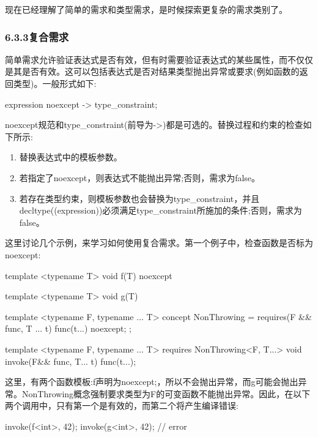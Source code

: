 现在已经理解了简单的需求和类型需求，是时候探索更复杂的需求类别了。

\subsubsection{6.3.3\hspace{0.2cm}复合需求}

简单需求允许验证表达式是否有效，但有时需要验证表达式的某些属性，而不仅仅是其是否有效。这可以包括表达式是否对结果类型抛出异常或要求(例如函数的返回类型)。一般形式如下:

\begin{cpp}
{ expression } noexcept -> type_constraint;
\end{cpp}

noexcept规范和type\_constraint(前导为->)都是可选的。替换过程和约束的检查如下所示:

\begin{enumerate}
\item
替换表达式中的模板参数。

\item
若指定了noexcept，则表达式不能抛出异常;否则，需求为false。

\item
若存在类型约束，则模板参数也会替换为type\_constraint，并且decltype((expression))必须满足type\_constraint所施加的条件;否则，需求为false。
\end{enumerate}

这里讨论几个示例，来学习如何使用复合需求。第一个例子中，检查函数是否标为noexcept:

\begin{cpp}
template <typename T>
void f(T) noexcept {}

template <typename T>
void g(T) {}

template <typename F, typename ... T>
concept NonThrowing = requires(F && func, T ... t)
{
	{func(t...)} noexcept;
};

template <typename F, typename ... T>
	requires NonThrowing<F, T...>
void invoke(F&& func, T... t)
{
	func(t...);
}
\end{cpp}

这里，有两个函数模板:f声明为noexcept;，所以不会抛出异常，而g可能会抛出异常。NonThrowing概念强制要求类型为F的可变函数不能抛出异常。因此，在以下两个调用中，只有第一个是有效的，而第二个将产生编译错误:

\begin{cpp}
invoke(f<int>, 42);
invoke(g<int>, 42); // error
\end{cpp}

